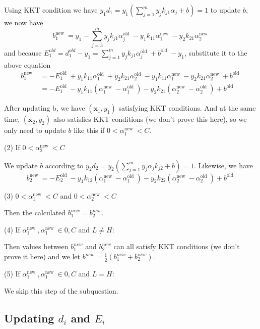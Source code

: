 \documentclass{article}
\begin{document}
Using KKT condition we have
$y_1 d_1=y_1\left(\sum_{j=1}^m y_j k_{j 1} \alpha_j+b\right)=1$ to update $b$, we now have 
$$
b_1^{\text {new }}=y_1-\sum_{j=3}^m y_j k_{j 1} \alpha_j^{\text {old }}-y_1 k_{11} \alpha_1^{\text {new }}-y_2 k_{21} \alpha_2^{\text {new }}
$$
and because $E_1^{o l d}=d_1^{o l d}-y_1=\sum_{j=1}^m y_j k_{j 1} \alpha_j^{\text {old }}+b^{\text {old }}-y_1$, substitute it to the above equation
$$
\begin{aligned}
b_1^{\text {new }} &=-E_1^{\text {old }}+y_1 k_{11} \alpha_1^{\text {old }}+y_2 k_{21} \alpha_2^{\text {old }}-y_1 k_{11} \alpha_1^{\text {new }}-y_2 k_{21} \alpha_2^{\text {new }}+b^{\text {old }} \\
&=-E_1^{\text {old }}-y_1 k_{11}\left(\alpha_1^{\text {new }}-\alpha_1^{\text {old }}\right)-y_2 k_{21}\left(\alpha_2^{\text {new }}-\alpha_2^{\text {old }}\right)+b^{\text {old }}
\end{aligned}
$$

After updating b, we have $(\boldsymbol{x}_1,y_1)$ satisfying KKT conditions. And at the same time, $(\boldsymbol{x}_2,y_2)$ also satisfies KKT conditions (we don't prove this here), so we only need to update $b$ like this if $0 < \alpha_1^{\text {new }} < C$.

\noindent (2) If $0 < \alpha_2^{\text {new }} < C$

We update $b$ according to $y_2 d_2=y_2\left(\sum_{j=1}^m y_j \alpha_j k_{j 2}+b\right)=1$. Likewise, we have
$$
b_2^{\text {new }}=-E_2^{\text {old }}-y_1 k_{12}\left(\alpha_1^{\text {new }}-\alpha_1^{\text {old }}\right)-y_2 k_{22}\left(\alpha_2^{\text {new }}-\alpha_2^{\text {old }}\right)+b^{\text {old }}
$$

\noindent (3) $0<\alpha_1^{\text {new }}<C$ and $0<\alpha_2^{\text {new }}<C$

Then the calculated $b_1^{n e w}=b_2^{n e w}$.

\noindent (4) If $\alpha_1^{\text {new }}, \alpha_1^{\text {new }} \in {0,C}$ and $L \neq H$:

Then values between $b_1^{n e w}$ and $b_2^{n e w}$ can all satisfy KKT conditions (we don't prove it here) and we let $b^{n e w} = \frac{1}{2}(b_1^{n e w}+b_2^{n e w})$.

\noindent (5) If $\alpha_1^{\text {new }}, \alpha_1^{\text {new }} \in {0,C}$ and $L = H$:

We skip this step of the subquestion.

\subsection{Updating $d_i$ and $E_i$}
\end{document}

